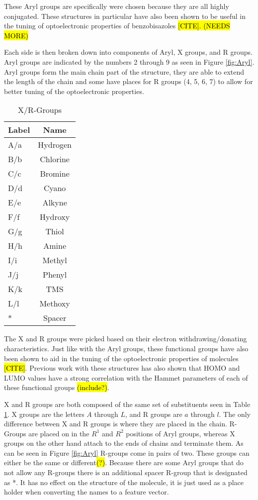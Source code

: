 \documentclass[10pt]{article}
\begin{document}
These Aryl groups are specifically were chosen because they are all highly conjugated. These structures in particular have also been shown to be useful in the tuning of optoelectronic properties of benzobisazoles \hl{[CITE]. (NEEDS MORE)}

Each side is then broken down into components of Aryl, X groups, and R groups. Aryl groups are indicated by the numbers 2 through 9 as seen in Figure \ref{fig:Aryl}. Aryl groups form the main chain part of the structure, they are able to extend the length of the chain and some have places for R groups (4, 5, 6, 7) to allow for better tuning of the optoelectronic properties.

\begin{table}[H]
  \centering
  \caption{X/R-Groups}
  \begin{tabular}{lc}
    Label   & Name      \\
    \hline
    A/a     & Hydrogen  \\
    B/b     & Chlorine  \\
    C/c     & Bromine   \\
    D/d     & Cyano     \\
    E/e     & Alkyne    \\
    F/f     & Hydroxy   \\
    G/g     & Thiol     \\
    H/h     & Amine     \\
    I/i     & Methyl    \\
    J/j     & Phenyl    \\
    K/k     & TMS       \\
    L/l     & Methoxy   \\
    *       & Spacer    \\
    \hline
  \end{tabular}
  \label{tab:xrgroups}
\end{table}

The X and R groups were picked based on their electron withdrawing/donating characteristics. Just like with the Aryl groups, these functional groups have also been shown to aid in the tuning of the optoelectronic properties of molecules \hl{[CITE]}. Previous work with these structures has also shown that HOMO and LUMO values have a strong correlation with the Hammet parameters of each of these functional groups \hl{(include?)}.

X and R groups are both composed of the same set of substituents seen in Table \ref{tab:xrgroups}. X groups are the letters $A$ through $L$, and R groups are $a$ through $l$. The only difference between X and R groups is where they are placed in the chain. R-Groups are placed on in the $R^1$ and $R^2$ positions of Aryl groups, whereas X groups on the other hand attach to the ends of chains and terminate them. As can be seen in Figure \ref{fig:Aryl} R-groups come in pairs of two. These groups can either be the same or different\hl{(?)}. Because there are some Aryl groups that do not allow any R-groups there is an additional spacer R-group that is designated as *. It has no effect on the structure of the molecule, it is just used as a place holder when converting the names to a feature vector.
\end{document}
